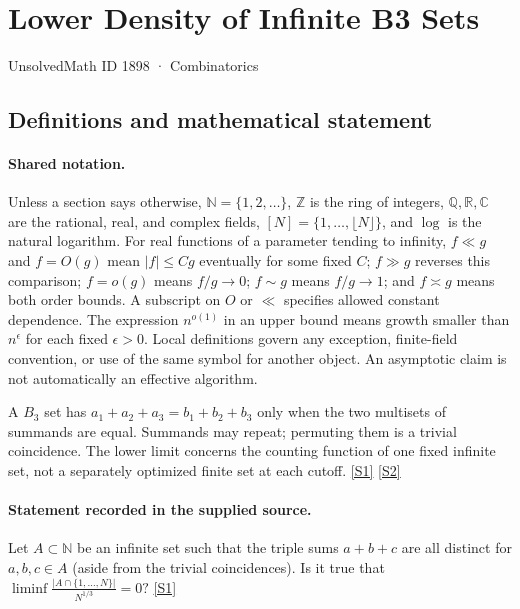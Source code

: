 \documentclass[11pt,a4paper]{article}
\newcommand{\N}{\mathbb{N}}
\newcommand{\Z}{\mathbb{Z}}
\newcommand{\Q}{\mathbb{Q}}
\newcommand{\R}{\mathbb{R}}
\newcommand{\C}{\mathbb{C}}
\newcommand{\sref}[2]{\hyperlink{source:#1:#2}{[S#2]}}
\begin{document}

\setcounter{section}{1897}

\section{Lower Density of Infinite B3 Sets}\label{1898}

{\small\sffamily UnsolvedMath ID 1898 · Combinatorics}

\subsection{Definitions and mathematical statement}

\paragraph{Shared notation.}Unless a section says otherwise, $\N=\{1,2,\ldots\}$,
$\Z$ is the ring of integers, $\Q,\R,\C$ are the rational, real, and complex
fields, $[N]=\{1,\ldots,\lfloor N\rfloor\}$, and $\log$ is the natural
logarithm. For real functions of a parameter tending to infinity,
$f\ll g$ and $f=O(g)$ mean $|f|\leq Cg$ eventually for some fixed $C$;
$f\gg g$ reverses this comparison; $f=o(g)$ means $f/g\to0$;
$f\sim g$ means $f/g\to1$; and $f\asymp g$ means both order bounds.
A subscript on $O$ or $\ll$ specifies allowed constant dependence.
The expression $n^{o(1)}$ in an upper bound means growth smaller than
$n^\epsilon$ for each fixed $\epsilon>0$. Local definitions govern any
exception, finite-field convention, or use of the same symbol for another
object. An asymptotic claim is not automatically an effective algorithm.



A $B_3$ set has $a_1+a_2+a_3=b_1+b_2+b_3$ only when the two multisets of summands are equal. Summands may repeat; permuting them is a trivial coincidence. The lower limit concerns the counting function of one fixed infinite set, not a separately optimized finite set at each cutoff. \sref{1898}{1} \sref{1898}{2}

\paragraph{Statement recorded in the supplied source.}
Let $A\subset\mathbb{N}$ be an infinite set such that the triple sums $a+b+c$ are all distinct for $a,b,c\in A$ (aside from the trivial coincidences). Is it true that $ \liminf \frac{\lvert A\cap \{1,\ldots,N\}\rvert}{N^{1/3}}=0? $ \sref{1898}{1}
\end{document}
